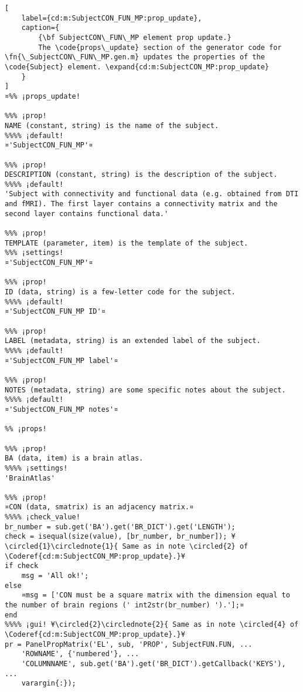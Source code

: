 \documentclass{tufte-handout}
\begin{document}
\begin{lstlisting}[
	label={cd:m:SubjectCON_FUN_MP:prop_update},
	caption={
		{\bf SubjectCON\_FUN\_MP element prop update.}
		The \code{props\_update} section of the generator code for \fn{\_SubjectCON\_FUN\_MP.gen.m} updates the properties of the \code{Subject} element. \expand{cd:m:SubjectCON_MP:prop_update}
	}
]
¤%% ¡props_update!

%%% ¡prop!
NAME (constant, string) is the name of the subject.
%%%% ¡default!
¤'SubjectCON_FUN_MP'¤

%%% ¡prop!
DESCRIPTION (constant, string) is the description of the subject.
%%%% ¡default!
'Subject with connectivity and functional data (e.g. obtained from DTI and fMRI). The first layer contains a connectivity matrix and the second layer contains functional data.'

%%% ¡prop!
TEMPLATE (parameter, item) is the template of the subject.
%%% ¡settings!
¤'SubjectCON_FUN_MP'¤

%%% ¡prop!
ID (data, string) is a few-letter code for the subject.
%%%% ¡default!
¤'SubjectCON_FUN_MP ID'¤

%%% ¡prop!
LABEL (metadata, string) is an extended label of the subject.
%%%% ¡default!
¤'SubjectCON_FUN_MP label'¤

%%% ¡prop!
NOTES (metadata, string) are some specific notes about the subject.
%%%% ¡default!
¤'SubjectCON_FUN_MP notes'¤

%% ¡props!

%%% ¡prop!
BA (data, item) is a brain atlas.
%%%% ¡settings!
'BrainAtlas'

%%% ¡prop!
¤CON (data, smatrix) is an adjacency matrix.¤
%%%% ¡check_value!
br_number = sub.get('BA').get('BR_DICT').get('LENGTH');
check = isequal(size(value), [br_number, br_number]); ¥\circled{1}\circlednote{1}{ Same as in note \circled{2} of \Coderef{cd:m:SubjectCON_MP:prop_update}.}¥
if check
    msg = 'All ok!';
else   
    ¤msg = ['CON must be a square matrix with the dimension equal to the number of brain regions (' int2str(br_number) ').'];¤
end
%%%% ¡gui! ¥\circled{2}\circlednote{2}{ Same as in note \circled{4} of \Coderef{cd:m:SubjectCON_MP:prop_update}.}¥
pr = PanelPropMatrix('EL', sub, 'PROP', SubjectFUN.FUN, ...
    'ROWNAME', {'numbered'}, ...
    'COLUMNNAME', sub.get('BA').get('BR_DICT').getCallback('KEYS'), ...
    varargin{:});

\end{lstlisting}
\clearpage
\end{document}
